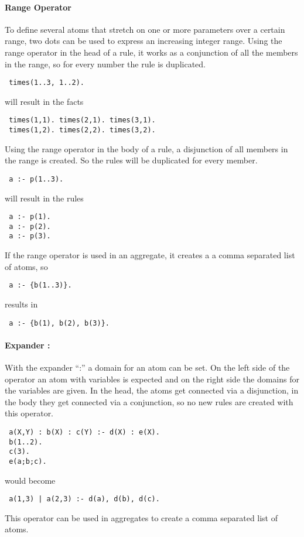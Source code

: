 \documentclass[a4paper,10pt]{article}
\begin{document}
\paragraph{Range Operator}
To define several atoms that stretch on one or more parameters over a certain range, two dots can be used to express an increasing integer range.
Using the range operator in the head of a rule, it works as a conjunction of all the members in the range, so for every number the rule is duplicated.
\begin{verbatim}
 times(1..3, 1..2).
\end{verbatim}
will result in the facts
\begin{verbatim}
 times(1,1). times(2,1). times(3,1).
 times(1,2). times(2,2). times(3,2).
\end{verbatim}

Using the range operator in the body of a rule, a disjunction of all members in the range is created. So the rules will be duplicated for every member.
\begin{verbatim}
 a :- p(1..3).
\end{verbatim}
will result in the rules
\begin{verbatim}
 a :- p(1).
 a :- p(2).
 a :- p(3).
\end{verbatim}
If the range operator is used in an aggregate, it creates a a comma separated list of atoms, so
\begin{verbatim}
 a :- {b(1..3)}.
\end{verbatim}
results in
\begin{verbatim}
 a :- {b(1), b(2), b(3)}.
\end{verbatim}

\paragraph{Expander :}
With the expander ``:'' a domain for an atom can be set.
On the left side of the operator an atom with variables is expected and on the right side the domains for the variables are given.
In the head, the atoms get connected via a disjunction, in the body they get connected via a conjunction, so no new rules are created with this operator.
\begin{verbatim}
 a(X,Y) : b(X) : c(Y) :- d(X) : e(X).
 b(1..2).
 c(3).
 e(a;b;c).
\end{verbatim}
would become
\begin{verbatim}
 a(1,3) | a(2,3) :- d(a), d(b), d(c).
\end{verbatim}
This operator can be used in aggregates to create a comma separated list of atoms.
\end{document}
